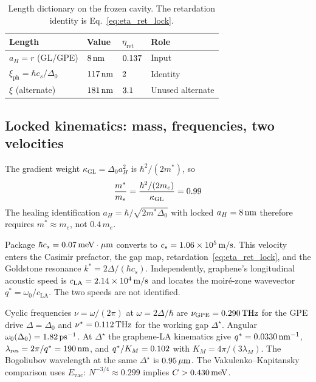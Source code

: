 \begin{table}[htbp]
\centering
\caption{Length dictionary on the frozen cavity. The retardation identity is Eq.~\eqref{eq:eta_ret_lock}.}
\begin{tabular}{llll}
\hline
\textbf{Length} & \textbf{Value} & $\eta_{\mathrm{ret}}$ & \textbf{Role} \\
\hline
$a_H=r$ (GL/GPE) & $8\,\mathrm{nm}$ & $0.137$ & Input \\
$\xi_{\mathrm{ph}}=\hbar c_s/\Delta_0$ & $117\,\mathrm{nm}$ & $2$ & Identity \\
$\xi$ (alternate) & $181\,\mathrm{nm}$ & $3.1$ & Unused alternate \\
\hline
\end{tabular}
\label{tab:length_dict}
\end{table}

\subsection{Locked kinematics: mass, frequencies, two velocities}
\label{sec:kinematics_dict}

The gradient weight $\kappa_{\mathrm{GL}}=\Delta_0 a_H^2$ is $\hbar^2/(2m^*)$, so
\begin{equation}
\frac{m^*}{m_e}=\frac{\hbar^2/(2m_e)}{\kappa_{\mathrm{GL}}}=0.99
\end{equation}
The healing identification $a_H=\hbar/\sqrt{2m^*\Delta_0}$ with locked $a_H=8\,\mathrm{nm}$ therefore requires $m^*\approx m_e$, not $0.4\,m_e$.

Package $\hbar c_s=0.07\,\mathrm{meV\cdot\mu m}$ converts to $c_s=1.06\times 10^{5}\,\mathrm{m/s}$. This velocity enters the Casimir prefactor, the gap map, retardation~\eqref{eq:eta_ret_lock}, and the Goldstone resonance $k^*=2\Delta/(\hbar c_s)$. Independently, graphene's longitudinal acoustic speed is $c_{\mathrm{LA}}=2.14\times 10^{4}\,\mathrm{m/s}$ and locates the moiré-zone wavevector $q^*=\omega_0/c_{\mathrm{LA}}$. The two speeds are not identified.

Cyclic frequencies $\nu=\omega/(2\pi)$ at $\omega=2\Delta/\hbar$ are $\nu_{\mathrm{GPE}}=0.290\,\mathrm{THz}$ for the GPE drive $\Delta=\Delta_0$ and $\nu^\star=0.112\,\mathrm{THz}$ for the working gap $\Delta^\star$. Angular $\omega_0(\Delta_0)=1.82\,\mathrm{ps}^{-1}$. At $\Delta^\star$ the graphene-LA kinematics give $q^*=0.0330\,\mathrm{nm}^{-1}$, $\lambda_{\mathrm{res}}=2\pi/q^*=190\,\mathrm{nm}$, and $q^*/K_M=0.102$ with $K_M=4\pi/(3\lambda_M)$. The Bogoliubov wavelength at the same $\Delta^\star$ is $0.95\,\mu\mathrm{m}$. The Vakulenko--Kapitansky comparison uses $E_{\mathrm{vac}}$: $N^{-3/4}\approx 0.299$ implies $C > 0.430\,\mathrm{meV}$.


